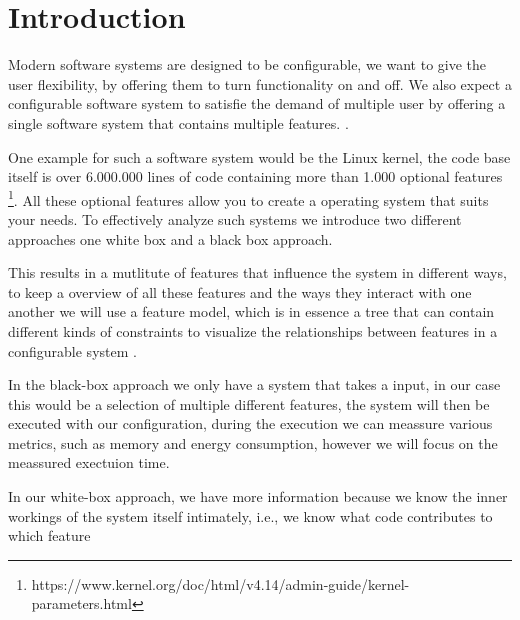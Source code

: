 \chapter{Introduction}\label{ch:introduction}

Modern software systems are designed to be configurable, we want to give the user flexibility, by offering them to turn functionality on 
and off. 
We also expect a configurable software system to satisfie the demand of multiple user by offering a single software system that 
contains multiple features. \cite{Feature-Oriented-Software-Product-Lines}. 

One example for such a software system would be the Linux kernel, the code base itself is over 6.000.000 lines of code containing more than 1.000 optional features 
\footnote{https://www.kernel.org/doc/html/v4.14/admin-guide/kernel-parameters.html}. 
All these optional features allow you to create a operating system that suits your needs. To effectively analyze such systems we introduce two different
approaches one white box and a black box approach.

This results in a mutlitute of features that influence the system in different ways, to keep a overview of all these features and the ways
they interact with one another we will use a feature model, which is in essence a tree that can contain different kinds of constraints
to visualize the relationships between features in a configurable system \cite{KangFeatureOrientedDomain1990}.

In the black-box approach we only have a system that takes a input, in our case this would be a selection of multiple different features, 
the system will then be executed with our configuration, during the execution we can meassure various metrics, such as memory and energy
consumption, however we will focus on the meassured exectuion time.

In our white-box approach, we have more information because we know the inner workings of the
system itself intimately, i.e., we know what code contributes to which feature

